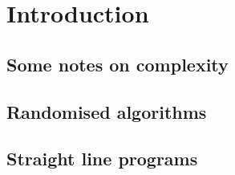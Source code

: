 
\chapter{Introduction}


\section{Some notes on complexity}

\section{Randomised algorithms}

\section{Straight line programs}
